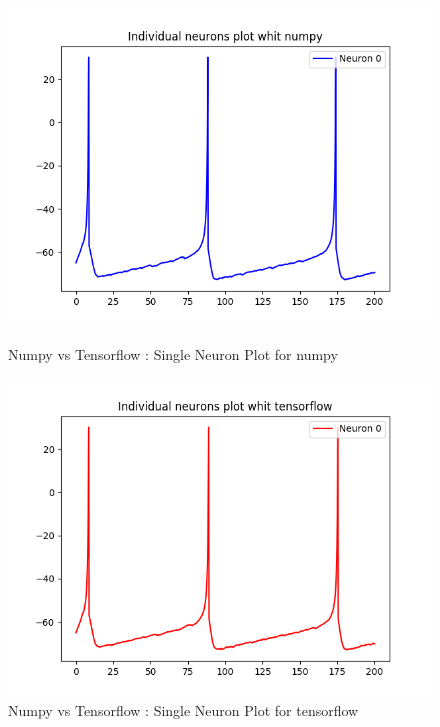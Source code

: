 \documentclass[12pt]{scrartcl}
\begin{document}
\begin{figure}[!h]
\begin{minipage}[l]{.48\linewidth}
\centering
\includegraphics[scale=0.5]{imgs/neuronplotnp.png}
\caption{Numpy vs Tensorflow : Single Neuron Plot for numpy}
\label{neuronplotnp}
\end{minipage}\hfill
\begin{minipage}[l]{.48\linewidth}
\centering
\includegraphics[scale=0.5]{imgs/neuronplottf.png}
\caption{Numpy vs Tensorflow : Single Neuron Plot for tensorflow}
\label{neuronplottf}
\end{minipage}\hfill
\end{figure}
\end{document}
